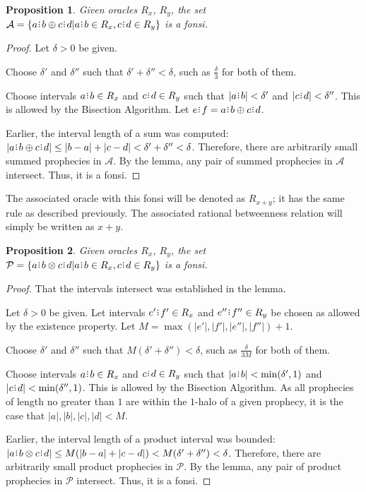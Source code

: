 \documentclass[12pt]{article}
\newtheorem{proposition}{Proposition}[section]
\begin{document}
\begin{proposition}
    Given oracles $R_x$, $R_y$, the set $\mathcal{A} = \{a\rint b \oplus c\rint d| a\rint b \in R_x, c\rint d \in R_y\}$ is a fonsi. 
\end{proposition}

\begin{proof}

    Let $\delta > 0$ be given. 

    Choose $\delta'$ and $\delta''$ such that $\delta' + \delta'' < \delta$, such as $\frac{\delta}{3}$ for both of them. 

    Choose intervals $a\rint b \in R_x$ and $c\rint d \in R_y$  such that  $|a\rint b| < \delta'$ and $|c\rint d| < \delta''$. This is allowed by the Bisection Algorithm. Let $e\rint f = a\rint b \oplus c\rint d$.
     
    Earlier, the interval length of a sum was computed:   $|a\rint b \oplus c\rint d| \leq |b-a| + |c-d| < \delta' + \delta'' < \delta$. Therefore, there are arbitrarily small summed prophecies in $\mathcal{A}$. By the lemma, any pair of summed prophecies in $\mathcal{A}$ intersect. Thus, it is a fonsi. 
    
\end{proof}


The associated oracle with this fonsi will be denoted as $R_{x + y}$; it has the same rule as described previously. The associated rational betweenness relation will simply be written as $x+y$. 

\begin{proposition}
    Given oracles $R_x$, $R_y$, the set $\mathcal{P} = \{a\rint b \otimes c\rint d| a\rint b \in R_x, c\rint d \in R_y\}$ is a fonsi. 
\end{proposition}

\begin{proof}
    That the intervals intersect was established in the lemma. 

    Let $\delta > 0$ be given. Let intervals $e'\rint f' \in R_x$ and $e''\rint f'' \in R_y$ be chosen as allowed by the existence property. Let $M = \max(|e'|, |f'|, |e''|, |f''|) +1$. 

    Choose $\delta'$ and $\delta''$ such that $M(\delta' + \delta'') < \delta$, such as $\frac{\delta}{3M}$ for both of them. 

    Choose intervals $a\rint b \in R_x$ and $c\rint d \in R_y$  such that  $|a\rint b| < \min(\delta', 1)$ and $|c\rint d| < \min(\delta'', 1)$. This is allowed by the Bisection Algorithm. As all prophecies of length no greater than $1$ are within the $1$-halo of a given prophecy, it is the case that $|a|, |b|, |c|, |d| < M$. 
     
    Earlier, the interval length of a product interval was bounded:   $|a\rint b \otimes c\rint d| \leq M (|b-a| + |c-d|) < M (\delta' + \delta'') < \delta$. Therefore, there are arbitrarily small product prophecies in $\mathcal{P}$. By the lemma, any pair of product prophecies in $\mathcal{P}$ intersect. Thus, it is a fonsi. 
    
\end{proof}
\end{document}
